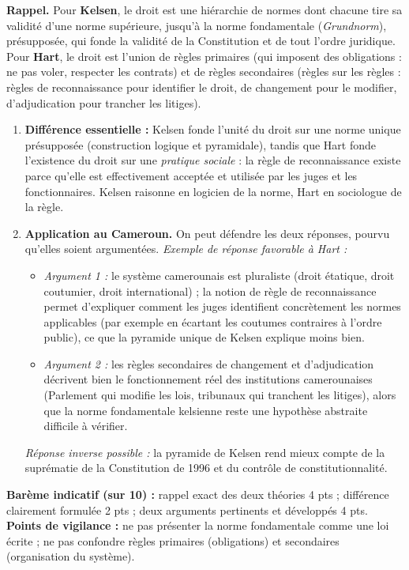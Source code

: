 \documentclass[11pt]{article}
\newcommand{\cle}[1]{{\popxbold\color{popdark}#1}}
\begin{document}
\begin{corrige}
\textbf{Rappel.} Pour \textbf{Kelsen}, le droit est une hiérarchie de normes dont chacune tire sa validité d'une norme supérieure, jusqu'à la \cle{norme fondamentale} (\emph{Grundnorm}), présupposée, qui fonde la validité de la Constitution et de tout l'ordre juridique. Pour \textbf{Hart}, le droit est l'union de \cle{règles primaires} (qui imposent des obligations : ne pas voler, respecter les contrats) et de \cle{règles secondaires} (règles sur les règles : règles de reconnaissance pour identifier le droit, de changement pour le modifier, d'adjudication pour trancher les litiges).
\begin{enumerate}
\item \textbf{Différence essentielle :} Kelsen fonde l'unité du droit sur une norme unique présupposée (construction logique et pyramidale), tandis que Hart fonde l'existence du droit sur une \emph{pratique sociale} : la règle de reconnaissance existe parce qu'elle est effectivement acceptée et utilisée par les juges et les fonctionnaires. Kelsen raisonne en logicien de la norme, Hart en sociologue de la règle.
\item \textbf{Application au Cameroun.} On peut défendre les deux réponses, pourvu qu'elles soient argumentées. \emph{Exemple de réponse favorable à Hart :}
\begin{itemize}
\item \emph{Argument 1 :} le système camerounais est pluraliste (droit étatique, droit coutumier, droit international) ; la notion de règle de reconnaissance permet d'expliquer comment les juges identifient concrètement les normes applicables (par exemple en écartant les coutumes contraires à l'ordre public), ce que la pyramide unique de Kelsen explique moins bien.
\item \emph{Argument 2 :} les règles secondaires de changement et d'adjudication décrivent bien le fonctionnement réel des institutions camerounaises (Parlement qui modifie les lois, tribunaux qui tranchent les litiges), alors que la norme fondamentale kelsienne reste une hypothèse abstraite difficile à vérifier.
\end{itemize}
\emph{Réponse inverse possible :} la pyramide de Kelsen rend mieux compte de la suprématie de la Constitution de 1996 et du contrôle de constitutionnalité.
\end{enumerate}
\textbf{Barème indicatif (sur 10) :} rappel exact des deux théories 4 pts ; différence clairement formulée 2 pts ; deux arguments pertinents et développés 4 pts.
\textbf{Points de vigilance :} ne pas présenter la norme fondamentale comme une loi écrite ; ne pas confondre règles primaires (obligations) et secondaires (organisation du système).
\end{corrige}
\end{document}
